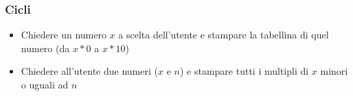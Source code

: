 \begin{exerciseframe}
    \frametitle{Cicli}

    \begin{itemize}
        \item Chiedere un numero $x$ a scelta dell'utente e stampare la tabellina di quel numero (da $x*0$ a $x*10$)

        \pause
        \bigskip
        \item Chiedere all'utente due numeri ($x$ e $n$) e stampare tutti i multipli di $x$ minori o uguali ad $n$
    \end{itemize}
\end{exerciseframe}